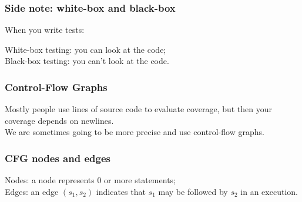 \documentclass{beamer}
\newenvironment{changemargin}[1]{%
  \begin{list}{}{%
    \setlength{\topsep}{0pt}%
    \setlength{\leftmargin}{#1}%
    \setlength{\rightmargin}{1em}
    \setlength{\listparindent}{\parindent}%
    \setlength{\itemindent}{\parindent}%
    \setlength{\parsep}{\parskip}%
  }%
  \item[]}{\end{list}}
\begin{document}
\begin{frame}
  \frametitle{Side note: white-box and black-box}
  \Large
  \hspace*{1em} When you write tests:\\[0.5em]
  \begin{changemargin}{2em}
    \alert{White-box testing:} you can look at the code;\\[1em]
    \alert{Black-box testing:} you can't look at the code.
  \end{changemargin}
\end{frame}

\usebackgroundtemplate{}
\begin{frame}
  \frametitle{Control-Flow Graphs}
  \large
  \begin{changemargin}{2em}
    Mostly people use lines of source code to evaluate coverage,
    but then your coverage depends on newlines.\\[1em]
    We are sometimes going to be more precise and use \alert{control-flow graphs}.
  \end{changemargin}
\end{frame}

\begin{frame}
  \frametitle{CFG nodes and edges}
  \large
  \begin{changemargin}{2em}
    Nodes: a node represents 0 or more statements;\\[1em]
    Edges: an edge $(s_1, s_2)$ indicates that $s_1$ may be followed by $s_2$ in an execution.
  \end{changemargin}
\end{frame}
\end{document}
